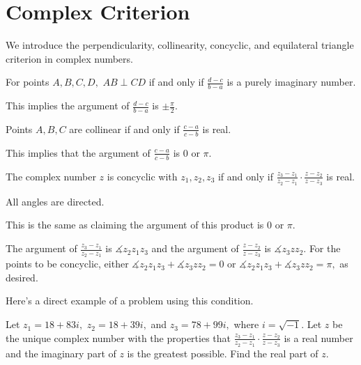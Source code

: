 \documentclass[blue,onecol]{shooting}
\begin{document}
\section{Complex Criterion}
We introduce the perpendicularity, collinearity, concyclic, and equilateral triangle criterion in complex numbers.

\begin{theo}
For points $A,B,C,D,$ $AB\perp CD$ if and only if $\frac{d-c}{b-a}$ is a purely imaginary number.
\end{theo}

\begin{pro}
This implies the argument of $\frac{d-c}{b-a}$ is $\pm \frac{\pi}{2}.$
\end{pro}

\begin{theo}
Points $A,B,C$ are collinear if and only if $\frac{c-a}{c-b}$ is real.
\end{theo}

\begin{pro}
This implies that the argument of $\frac{c-a}{c-b}$ is $0$ or $\pi.$
\end{pro}

\begin{theo}
The complex number $z$ is concyclic with $z_1,z_2,z_3$ if and only if $\frac{z_3-z_1}{z_2-z_1}\cdot\frac{z-z_2}{z-z_3}$ is real.
\end{theo}

\begin{pro}
All angles are directed.

This is the same as claiming the argument of this product is $0$ or $\pi.$ 

The argument of $\frac{z_3-z_1}{z_2-z_1}$ is $\measuredangle z_2z_1z_3$ and the argument of $\frac{z-z_2}{z-z_3}$ is $\measuredangle z_3zz_2.$ For the points to be concyclic, either $\measuredangle z_2z_1z_3+\measuredangle z_3zz_2=0$ or $\measuredangle z_2z_1z_3+\measuredangle z_3zz_2=\pi,$ as desired.
\end{pro}

Here's a direct example of a problem using this condition.

\begin{exam}[AIME I 2017/10]
Let $z_1=18+83i,$ $z_2=18+39i,$ and $z_3=78+99i,$ where $i=\sqrt{-1}.$ Let $z$ be the unique complex number with the properties that $\frac{z_3-z_1}{z_2-z_1}\cdot\frac{z-z_2}{z-z_3}$ is a real number and the imaginary part of $z$ is the greatest possible. Find the real part of $z$.
\end{exam}
\end{document}
